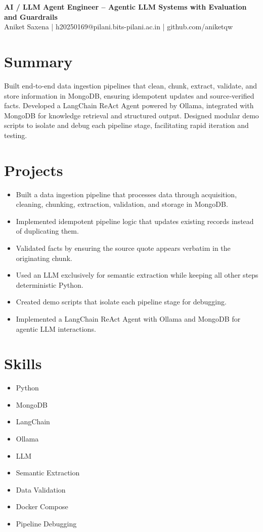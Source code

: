 \documentclass[11pt,a4paper]{article}
\begin{document}
\begin{center}{\LARGE\bfseries AI / LLM Agent Engineer – Agentic LLM Systems with Evaluation and Guardrails}\\[4pt]
Aniket Saxena | h20250169@pilani.bits-pilani.ac.in | github.com/aniketqw\end{center}

\section*{Summary}
Built end‑to‑end data ingestion pipelines that clean, chunk, extract, validate, and store information in MongoDB, ensuring idempotent updates and source‑verified facts. Developed a LangChain ReAct Agent powered by Ollama, integrated with MongoDB for knowledge retrieval and structured output. Designed modular demo scripts to isolate and debug each pipeline stage, facilitating rapid iteration and testing.

\section*{Projects}
\begin{itemize}
  \item Built a data ingestion pipeline that processes data through acquisition, cleaning, chunking, extraction, validation, and storage in MongoDB.
  \item Implemented idempotent pipeline logic that updates existing records instead of duplicating them.
  \item Validated facts by ensuring the source quote appears verbatim in the originating chunk.
  \item Used an LLM exclusively for semantic extraction while keeping all other steps deterministic Python.
  \item Created demo scripts that isolate each pipeline stage for debugging.
  \item Implemented a LangChain ReAct Agent with Ollama and MongoDB for agentic LLM interactions.
\end{itemize}

\section*{Skills}
\begin{itemize}
  \item Python
  \item MongoDB
  \item LangChain
  \item Ollama
  \item LLM
  \item Semantic Extraction
  \item Data Validation
  \item Docker Compose
  \item Pipeline Debugging
\end{itemize}
\end{document}
